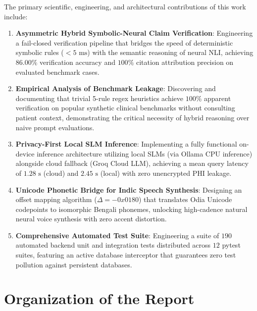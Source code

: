 The primary scientific, engineering, and architectural contributions of this work include:
\begin{enumerate}
    \item \textbf{Asymmetric Hybrid Symbolic-Neural Claim Verification}: Engineering a fail-closed verification pipeline that bridges the speed of deterministic symbolic rules ($<5\text{ ms}$) with the semantic reasoning of neural NLI, achieving $86.00\%$ verification accuracy and $100\%$ citation attribution precision on evaluated benchmark cases.
    \item \textbf{Empirical Analysis of Benchmark Leakage}: Discovering and documenting that trivial 5-rule regex heuristics achieve $100\%$ apparent verification on popular synthetic clinical benchmarks without consulting patient context, demonstrating the critical necessity of hybrid reasoning over naive prompt evaluations.
    \item \textbf{Privacy-First Local SLM Inference}: Implementing a fully functional on-device inference architecture utilizing local SLMs (via Ollama CPU inference) alongside cloud fallback (Groq Cloud LLM), achieving a mean query latency of $1.28\text{ s}$ (cloud) and $2.45\text{ s}$ (local) with zero unencrypted PHI leakage.
    \item \textbf{Unicode Phonetic Bridge for Indic Speech Synthesis}: Designing an offset mapping algorithm ($\Delta = -0x0180$) that translates Odia Unicode codepoints to isomorphic Bengali phonemes, unlocking high-cadence natural neural voice synthesis with zero accent distortion.
    \item \textbf{Comprehensive Automated Test Suite}: Engineering a suite of $190$ automated backend unit and integration tests distributed across $12$ pytest suites, featuring an active database interceptor that guarantees zero test pollution against persistent databases.
\end{enumerate}


\section{Organization of the Report}
\label{sec:intro_organization}

